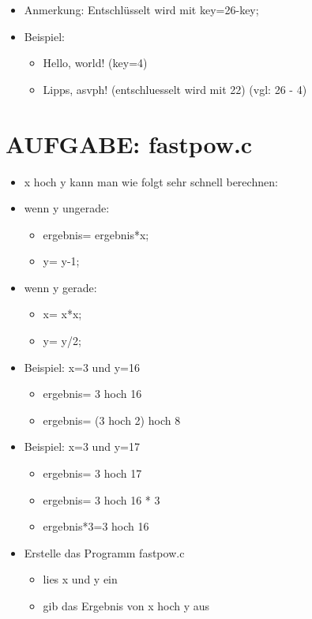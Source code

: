 \documentclass[11pt]{article}
\begin{document}
\begin{itemize}
\item Anmerkung: Entschlüsselt wird mit key=26-key;

\item Beispiel:
\begin{itemize}
\item Hello, world!		(key=4)
\item Lipps, asvph! 		(entschluesselt wird mit 22) (vgl: 26  - 4)
\end{itemize}
\end{itemize}


\section{AUFGABE: fastpow.c}
\label{sec:org687ecee}
\begin{itemize}
\item x hoch y kann man wie folgt sehr schnell berechnen:
\item wenn y ungerade:
\begin{itemize}
\item ergebnis= ergebnis*x;
\item y= y-1;
\end{itemize}
\item wenn y gerade:
\begin{itemize}
\item x= x*x;
\item y= y/2;
\end{itemize}

\item Beispiel: x=3 und y=16
\begin{itemize}
\item ergebnis= 3 hoch 16
\item ergebnis= (3 hoch 2) hoch 8
\end{itemize}

\item Beispiel: x=3 und y=17
\begin{itemize}
\item ergebnis= 3 hoch 17
\item ergebnis= 3 hoch 16 * 3
\item ergebnis*3=3 hoch 16
\end{itemize}

\item Erstelle das Programm fastpow.c
\begin{itemize}
\item lies x und y ein
\item gib das Ergebnis von x hoch y aus
\end{itemize}
\end{itemize}
\end{document}
